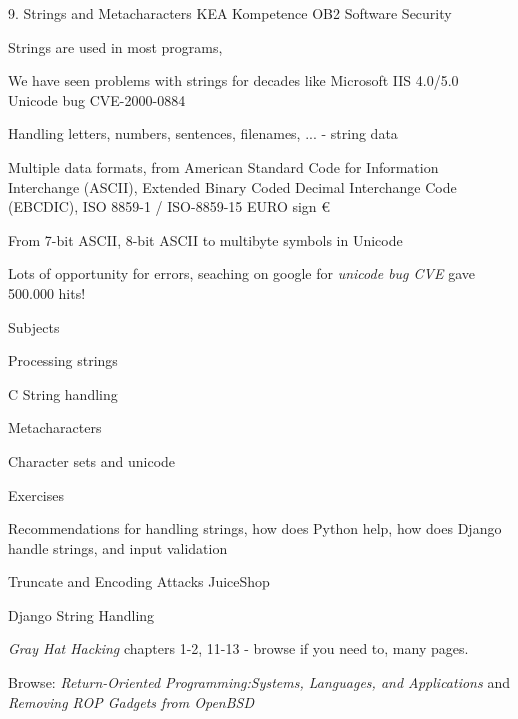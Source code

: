 \documentclass[Screen16to9,17pt]{foils}
\begin{document}
\mytitlepage
{9. Strings and Metacharacters}
{KEA Kompetence OB2 Software Security}



\begin{list1}
\item Strings are used in most programs,
\item We have seen problems with strings for decades like Microsoft IIS 4.0/5.0 Unicode bug CVE-2000-0884
\item Handling letters, numbers, sentences, filenames, ... - string data
\item Multiple data formats, from American Standard Code for Information Interchange (ASCII), Extended Binary Coded Decimal Interchange Code (EBCDIC), ISO 8859-1 / ISO-8859-15 EURO sign €
\item From 7-bit ASCII, 8-bit ASCII to multibyte symbols in Unicode
\item Lots of opportunity for errors, seaching on google for \emph{unicode bug CVE} gave 500.000 hits!
\end{list1}


\begin{list1}
\item Subjects
\begin{list2}
\item Processing strings
\item C String handling
\item Metacharacters
\item Character sets and unicode
\end{list2}
\item Exercises
\begin{list2}
\item Recommendations for handling strings, how does Python help, how does Django handle strings, and input validation
\item Truncate and Encoding Attacks JuiceShop
\item Django String Handling
\end{list2}
\end{list1}


\begin{list1}
\item \emph{Gray Hat Hacking} chapters 1-2, 11-13 - browse if you need to, many pages.
\item Browse: \emph{Return-Oriented Programming:Systems, Languages, and Applications} and \emph{Removing ROP Gadgets from OpenBSD}
\end{list1}
\end{document}
